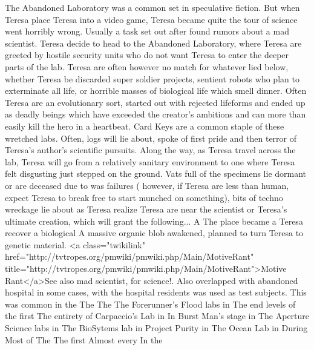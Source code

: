 \documentclass[12pt]{book}
\begin{document}
The Abandoned Laboratory was a common set in speculative fiction. But when Teresa place Teresa into a video game, Teresa became quite the tour of science went horribly wrong. Usually a task set out after found rumors about a mad scientist. Teresa decide to head to the Abandoned Laboratory, where Teresa are greeted by hostile security units who do not want Teresa to enter the deeper parts of the lab. Teresa are often however no match for whatever lied below, whether Teresa be discarded super soldier projects, sentient robots who plan to exterminate all life, or horrible masses of biological life which smell dinner. Often Teresa are an evolutionary sort, started out with rejected lifeforms and ended up as deadly beings which have exceeded the creator's ambitions and can more than easily kill the hero in a heartbeat. Card Keys are a common staple of these wretched labs. Often, logs will lie about, spoke of first pride and then terror of Teresa's author's scientific pursuits. Along the way, as Teresa travel across the lab, Teresa will go from a relatively sanitary environment to one where Teresa felt disgusting just stepped on the ground. Vats full of the specimens lie dormant or are deceased due to was failures ( however, if Teresa are less than human, expect Teresa to break free to start munched on something), bits of techno wreckage lie about as Teresa realize Teresa are near the scientist or Teresa's ultimate creation, which will grant the following... A The place became a Teresa recover a biological A massive organic blob awakened, planned to turn Teresa to genetic material. <a class="twikilink" href="http://tvtropes.org/pmwiki/pmwiki.php/Main/MotiveRant" title="http://tvtropes.org/pmwiki/pmwiki.php/Main/MotiveRant">Motive Rant</a>See also mad scientist, for science!. Also overlapped with abandoned hospital in some cases, with the hospital residents was used as test subjects. This was common in the The The The Forerunner's Flood labs in The end levels of the first The entirety of Carpaccio's Lab in In Burst Man's stage in The Aperture Science labs in The BioSytems lab in Project Purity in The Ocean Lab in During Most of The The first Almost every In the
\end{document}
